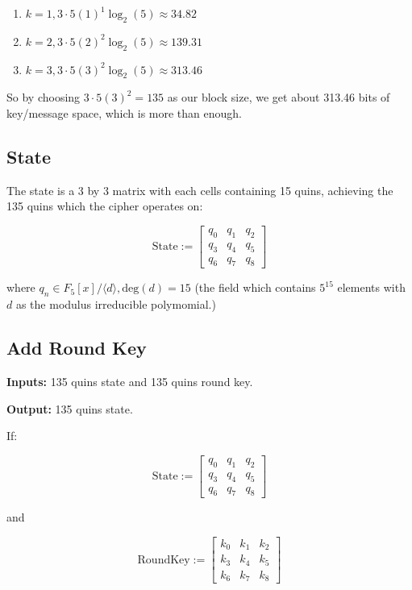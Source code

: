\documentclass{article}
\begin{document}
\begin{enumerate}
\item $k=1, 3\cdot 5(1)^1\log_2(5) \approx 34.82$
\item $k=2, 3\cdot 5(2)^2\log_2(5) \approx 139.31$
\item $k=3, 3\cdot 5(3)^2\log_2(5) \approx 313.46$
\end{enumerate}

So by choosing $3\cdot 5(3)^2 = 135$ as our block size, we get about 313.46
bits of key/message space, which is more than enough.

\subsection{State}

The state is a 3 by 3 matrix with each cells containing 15 quins, achieving
the 135 quins which the cipher operates on:

\[
\textrm{State} := 
\begin{bmatrix}
q_0 & q_1 & q_2 \\
q_3 & q_4 & q_5 \\
q_6 & q_7 & q_8
\end{bmatrix}
\]

where $q_n \in F_5[x]/\langle d \rangle,\mathrm{deg}(d) = 15$ (the field
which contains $5^{15}$ elements with $d$ as the modulus irreducible
polymomial.)


\subsection{Add Round Key}

\textbf{Inputs:} 135 quins state and 135 quins round key.

\noindent \textbf{Output:} 135 quins state.

\medskip

If:

\[
\textrm{State} := 
\begin{bmatrix}
q_0 & q_1 & q_2 \\
q_3 & q_4 & q_5 \\
q_6 & q_7 & q_8
\end{bmatrix}
\]

and

\[
\textrm{RoundKey} := 
\begin{bmatrix}
k_0 & k_1 & k_2 \\
k_3 & k_4 & k_5 \\
k_6 & k_7 & k_8
\end{bmatrix}
\]
\end{document}
